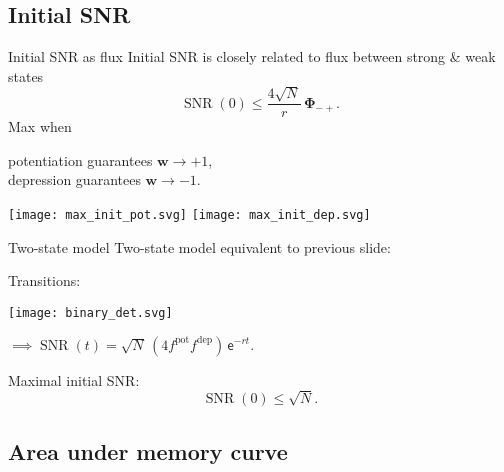 \documentclass{beamer}%
\DeclareMathOperator{\SNR}{SNR}
\DeclareMathOperator{\snr}{SNR}
\newcommand{\w}{\mathbf{w}}
\newcommand{\F}{\boldsymbol{\Phi}}
\newcommand{\pot}{^{\text{pot}}}
\newcommand{\dep}{^{\text{dep}}}
\renewcommand{\e}{\mathsf{e}}
\begin{document}
\subsection{Initial SNR}


\begin{frame}{Initial SNR as flux}
%
 Initial SNR is closely related to flux between strong \& weak states
 \begin{equation*}
   \SNR(0) \leq \frac{4\sqrt{N}}{r}\,\F_{-+}.
 \end{equation*}
 Max when {\parbox[t]{8cm}{potentiation guarantees $\w\to+1$,\\
 depression guarantees $\w\to-1$.}}
 \begin{center}
   \texttt{[image: max\_init\_pot.svg]}
   \hp \hp
   \texttt{[image: max\_init\_dep.svg]}
 \end{center}
%
\end{frame}


\begin{frame}{Two-state model}
%
 Two-state model equivalent to previous slide:
  \begin{center}
  Transitions:
   \parbox{2cm}{\texttt{[image: binary\_det.svg]}}
   $\implies\snr(t)=\sqrt{N}\,(4 f\pot f\dep)\,\e^{-rt}.$
  \end{center}

 \vp Maximal initial SNR:\note[item]{$f\pot=\half$}
 \begin{equation*}
   \snr(0) \leq \sqrt{N}.
 \end{equation*}
%
\end{frame}


\subsection{Area under memory curve}
\end{document}
